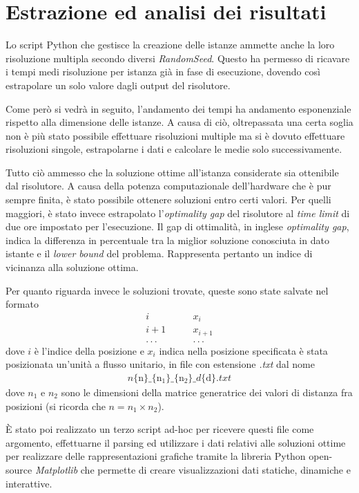 
\section{Estrazione ed analisi dei risultati}
Lo script Python che gestisce la creazione delle istanze ammette anche la loro risoluzione multipla secondo diversi \textit{RandomSeed}. 
Questo ha permesso di ricavare i tempi medi risoluzione per istanza già in fase di esecuzione, dovendo così estrapolare un solo valore 
dagli output del risolutore. 

Come però si vedrà in seguito, l'andamento dei tempi ha andamento esponenziale rispetto alla dimensione delle istanze. A causa di ciò, oltrepassata 
una certa soglia non è più stato possibile effettuare risoluzioni multiple ma si è dovuto effettuare risoluzioni singole, estrapolarne i dati 
e calcolare le medie solo successivamente.

Tutto ciò ammesso che la soluzione ottime all'istanza considerate sia ottenibile dal risolutore. A causa della potenza computazionale dell'hardware 
che è pur sempre finita, è stato possibile ottenere soluzioni entro certi valori. Per quelli maggiori, è stato invece estrapolato l'\textit{optimality gap} 
del risolutore al \textit{time limit} di due ore impostato per l'esecuzione. Il gap di ottimalità, in inglese \textit{optimality gap}, indica la differenza 
in percentuale tra la miglior soluzione conosciuta in dato istante e il \textit{lower bound} del problema. Rappresenta pertanto un indice di vicinanza 
alla soluzione ottima.

\noindent
Per quanto riguarda invece le soluzioni trovate, queste sono state salvate nel formato 
\begin{align*}
    i   &\qquad x_i \\
    i+1 &\qquad x_{i+1} \\
    .\, .\, . &\qquad .\, .\, .
\end{align*}
dove $i$ è l'indice della posizione e $x_i$ indica nella posizione specificata è stata posizionata un'unità a flusso unitario, 
in file con estensione \textit{.txt} dal nome
\begin{align*}
    n\{\text{n}\}\_\{\text{n}_1\}\_\{\text{n}_2\}\_d\{\text{d}\}.txt
\end{align*}
dove $n_1$ e $n_2$ sono le dimensioni della matrice generatrice dei valori di distanza fra posizioni (si ricorda che $n=n_1\times n_2$).

È stato poi realizzato un terzo script ad-hoc per ricevere questi file come argomento, effettuarne il parsing ed utilizzare i dati relativi alle 
soluzioni ottime per realizzare delle rappresentazioni grafiche tramite la libreria Python open-source \textit{Matplotlib} \cite{matplotlib} 
che permette di creare visualizzazioni dati statiche, dinamiche e interattive.